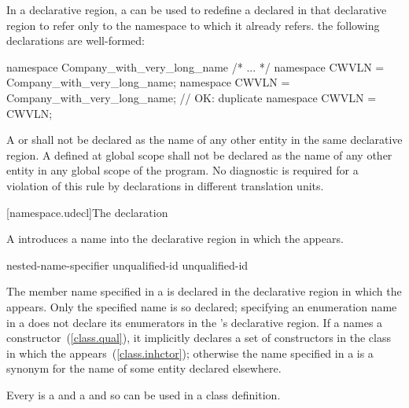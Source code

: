 \pnum
In a declarative region, a  can be
used to redefine a  declared in that
declarative region to refer only to the namespace to which it already
refers.
\enterexample
the following declarations are well-formed:

\begin{codeblock}
namespace Company_with_very_long_name { /* ... */ }
namespace CWVLN = Company_with_very_long_name;
namespace CWVLN = Company_with_very_long_name;          // OK: duplicate
namespace CWVLN = CWVLN;
\end{codeblock}
\exitexample

\pnum
A  or  shall not be
declared as the name of any other entity in the same declarative region.
A  defined at global scope shall not be
declared as the name of any other entity in any global scope of the
program. No diagnostic is required for a violation of this rule by
declarations in different translation units.

[namespace.udecl]{The  declaration}%

\pnum
A  introduces a name into the declarative
region in which the  appears.

\begin{bnf}
\br
     nested-name-specifier unqualified-id \terminal{;}\br
     unqualified-id \terminal{;}
\end{bnf}

The member name specified in a  is declared
in the declarative region in which the 
appears. \enternote Only the specified name is so declared; specifying
an enumeration name in a  does not declare
its enumerators in the 's declarative
region.
\exitnote
If a  names a constructor~(\ref{class.qual}), it
implicitly declares a set of constructors in the class in which the
 appears~(\ref{class.inhctor}); otherwise the
name specified in a  is a synonym for the name of
some entity declared elsewhere.

\pnum
Every  is a  and a
 and so can be used in a class definition.
\enterexample

